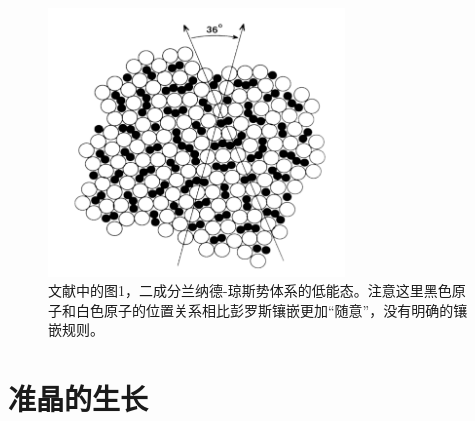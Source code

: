 \documentclass[hyperref, UTF8, a4paper]{ctexart}
\begin{document}
\begin{figure}
    \centering
    \includegraphics[width=0.7\textwidth]{10fold.PNG}
    \caption{文献\cite{PhysRevLett.58.706}中的图1，二成分兰纳德-琼斯势体系的低能态。注意这里黑色原子和白色原子的位置关系相比彭罗斯镶嵌更加“随意”，没有明确的镶嵌规则。}
    \label{fig:10fold}
\end{figure}

\section{准晶的生长}
\end{document}
